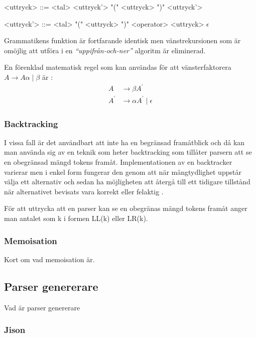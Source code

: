 \setlength{\grammarindent}{5em}
\begin{grammar}
  \singlespace\small%
  \selectfont
  <uttryck> ::= <tal> <uttryck'>
    \alt "(" <uttryck> ")" <uttryck'>

  <uttryck'> ::= <tal>
    \alt "(" <uttryck> ")"
    \alt <operator> <uttryck>
    \alt $\epsilon$
\end{grammar}

Grammatikens funktion är fortfarande identisk men vänstrekursionen som är
omöjlig att utföra i en \textit{``uppifrån-och-ner''} algoritm är eliminerad.

En förenklad matematisk regel som kan användas för att vänsterfaktorera
$A \rightarrow A\alpha\;|\;\beta$ är \citep[s. 212]{aa06}:
\begin{align*}
A &\rightarrow \beta A^\prime \\
A^\prime &\rightarrow \alpha A^\prime\;|\;\epsilon
\end{align*}

\subsubsection{Backtracking}

I vissa fall är det användbart att inte ha en begränsad framåtblick och då kan
man använda sig av en teknik som heter backtracking som tillåter parsern att
se en obegränsad mängd tokens framåt. Implementationen av en backtracker
varierar men i enkel form fungerar den genom att när mångtydlighet uppstår
välja ett alternativ och sedan ha möjligheten att återgå till ett tidigare
tillstånd när alternativet bevisats vara korrekt eller felaktig \citep[s. 55]{pt10}.

För att uttrycka att en parser kan se en obegränas mängd tokens framåt anger
man antalet som k i formen LL(k) eller LR(k).

\subsubsection{Memoisation}

Kort om vad memoisation är.

\subsection{Parser genererare}

Vad är parser genererare

\subsubsection{Jison}

